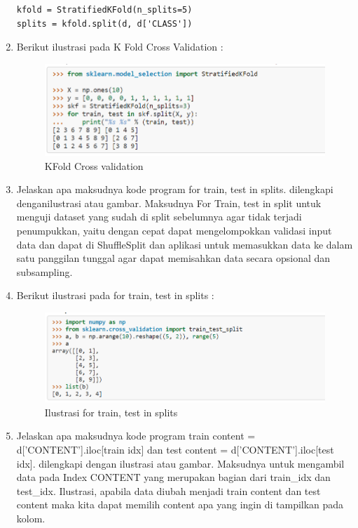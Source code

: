 \begin{enumerate}
\begin{lstlisting}[caption=K Fold Cross Validation,label={lst:7.0}]
kfold = StratifiedKFold(n_splits=5)
splits = kfold.split(d, d['CLASS'])
\end{lstlisting}

\item Berikut ilustrasi pada K Fold Cross Validation :
\begin{figure}[ht]
\centering
\includegraphics[scale=0.5]{figures/andi/7-2.PNG}
\caption{ KFold Cross validation}
\label{Teori}
\end{figure}

\item Jelaskan apa maksudnya kode program for train, test in splits. dilengkapi denganilustrasi atau gambar.
\subitem Maksudnya For Train, test in split untuk menguji dataset yang sudah di split sebelumnya agar tidak terjadi penumpukkan, yaitu dengan cepat dapat mengelompokkan validasi input data dan dapat di ShuffleSplit dan aplikasi untuk memasukkan data ke dalam satu panggilan tunggal agar dapat memisahkan data secara opsional dan subsampling.

\item Berikut ilustrasi pada for train, test in splits :
\begin{figure}[ht]
\centering
\includegraphics[scale=0.5]{figures/andi/7-3.PNG}
\caption{Ilustrasi for train, test in splits}
\label{Teori}
\end{figure}

\item Jelaskan apa maksudnya kode program train content = d[’CONTENT’].iloc[train idx] dan test content = d[’CONTENT’].iloc[test idx]. dilengkapi dengan ilustrasi atau gambar.
\subitem Maksudnya untuk mengambil data pada Index CONTENT yang merupakan bagian dari train\_idx dan test\_idx. 
Ilustrasi, apabila data diubah menjadi train content dan test content maka kita dapat memilih content apa yang ingin di tampilkan pada kolom.


\end{enumerate}
